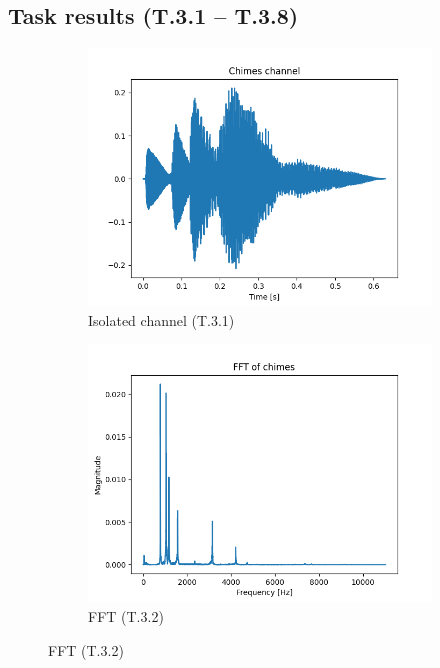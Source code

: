 \documentclass{article}
\begin{document}
\subsection*{Task results (T.3.1 – T.3.8)}
\begin{figure}[H]
\centering
\begin{subfigure}{0.45\linewidth}
  \includegraphics[width=\linewidth]{results/figures/task3_1_original_signal.png}
  \caption{Isolated channel (T.3.1)}
\end{subfigure}\hfill
\begin{subfigure}{0.45\linewidth}
  \includegraphics[width=\linewidth]{results/figures/task3_2_chimes_fft.png}
  \caption{FFT (T.3.2)}
\end{subfigure}


\end{figure}
\end{document}
